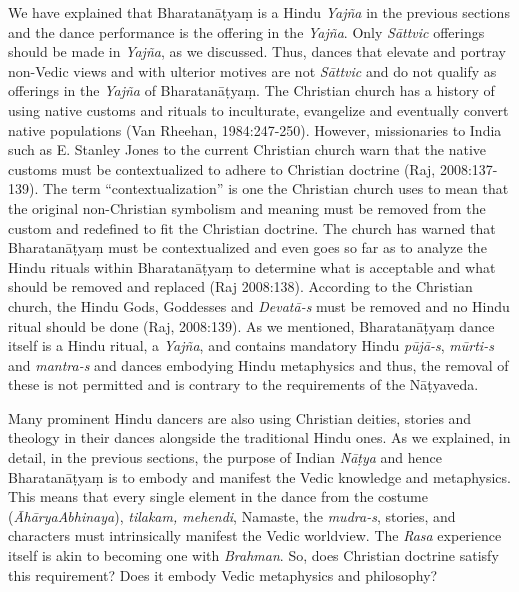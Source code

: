 We have explained that Bharatanāṭyaṃ is a Hindu \textit{Yajña} in the previous sections and the dance performance is the offering in the \textit{Yajña}. Only \textit{Sāttvic} offerings should be made in \textit{Yajña}, as we discussed. Thus, dances that elevate and portray non-Vedic views and with ulterior motives are not \textit{Sāttvic} and do not qualify as offerings in the \textit{Yajña} of Bharatanāṭyaṃ. The Christian church has a history of using native customs and rituals to inculturate, evangelize and eventually convert native populations (Van Rheehan, 1984:247-250). However, missionaries to India such as E. Stanley Jones to the current Christian church warn that the native customs must be contextualized to adhere to Christian doctrine (Raj, 2008:137-139). The term “contextualization” is one the Christian church uses to mean that the original non-Christian symbolism and meaning must be removed from the custom and redefined to fit the Christian doctrine. The church has warned that Bharatanāṭyaṃ must be contextualized and even goes so far as to analyze the Hindu rituals within Bharatanāṭyaṃ to determine what is acceptable and what should be removed and replaced (Raj 2008:138). According to the Christian church, the Hindu Gods, Goddesses and \textit{Devatā-s} must be removed and no Hindu ritual should be done (Raj, 2008:139). As we mentioned, Bharatanāṭyaṃ dance itself is a Hindu ritual, a \textit{Yajña}, and contains mandatory Hindu \textit{pūjā-s}, \textit{mūrti-s} and \textit{mantra-s} and dances embodying Hindu metaphysics and thus, the removal of these is not permitted and is contrary to the requirements of the Nāṭyaveda.

\vskip 2pt

Many prominent Hindu dancers are also using Christian deities, stories and theology in their dances alongside the traditional Hindu ones. As we explained, in detail, in the previous sections, the purpose of Indian \textit{Nāṭya }and hence Bharatanāṭyaṃ is to embody and manifest the Vedic knowledge and metaphysics. This means that every single element in the dance from the costume (\textit{ĀhāryaAbhinaya}), \textit{tilakam, mehendi}, Namaste, the \textit{mudra-s}, stories, and characters must intrinsically manifest the Vedic worldview. The \textit{Rasa} experience itself is akin to becoming one with \textit{Brahman}. So, does Christian doctrine satisfy this requirement? Does it embody Vedic metaphysics and philosophy?

